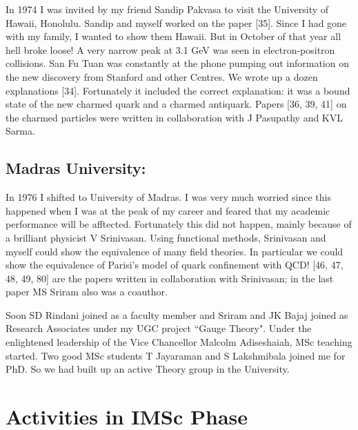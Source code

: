 In 1974 I was invited by my friend Sandip Pakvasa to visit the 
University of Hawaii, Honolulu. Sandip and myself worked on the paper 
[35]. Since I had gone with my family, I wanted to show them Hawaii. But 
in October of that year all hell broke loose! A very narrow peak at 3.1 
GeV was seen in electron-positron collisions. San Fu Tuan was constantly 
at the phone pumping out information on the new discovery from Stanford 
and other Centres. We wrote up a dozen explanations [34]. Fortunately it 
included the correct explanation: it was a bound state of the new 
charmed quark and a charmed antiquark. Papers [36, 39, 41] on the charmed 
particles were written in collaboration with J Pasupathy and KVL Sarma.

\subsection*{Madras University:}

In 1976 I shifted to University of Madras. I was very much worried since 
this happened when I was at the peak of my caree\-r and feared that my 
academic performance will be afftected. Fortunately this did not happen, 
mainly because of a brilliant physicist V Srinivasan. Using functional 
methods, Srinivasan and myself could show the equivalence of many field 
theories. In parti\-cular we could show the equivalence of Parisi's model 
of quark confinement with QCD! [46, 47, 48, 49, 80] are the papers written 
in collaboration with Srinivasan; in the last paper MS Sriram also was a 
coauthor.

Soon SD Rindani joined as a faculty member and Sriram and JK Bajaj 
joined as Research Associates under my UGC project ``Ga\-uge Theory". Under 
the enlightened leadership of the Vice Chancellor Malcolm Adiseshaiah, 
MSc teaching started. Two good MSc students T Jayaraman and S 
Lakshmibala joined me for PhD. So we had built up an active Theory group 
in the University.

\vspace{-\topsep}
\section*{Activities in IMSc Phase}

